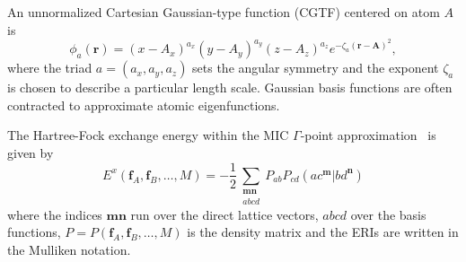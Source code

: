 \documentclass[prl,twocolumn,showpacs,twocolumngrid,superbib]{revtex4}
\def\Tr{{\rm Tr}}
\begin{document}
An unnormalized Cartesian Gaussian-type function (CGTF) centered on atom $A$ is
\begin{equation}
  \phi_a(\mathbf{r})=(x-A_x)^{a_x}(y-A_y)^{a_y}(z-A_z)^{a_z}e^{-\zeta_a(\mathbf{r-A})^2},
\end{equation}
where the triad $a=(a_x,a_y,a_z)$ sets the angular symmetry and the exponent $\zeta_a$
is chosen to describe a particular length scale. Gaussian basis functions are often
contracted to approximate atomic eigenfunctions.


The Hartree-Fock exchange energy within the MIC $\Gamma$-point approximation~\cite{CTymczak04b} 
is given by
\begin{equation}
E^x(\mathbf{f}_A,\mathbf{f}_B,\ldots,M)=
 -\frac{1}{2}\sum_{\substack{\mathbf{m}\mathbf{n}\\a b c d}}P_{ab}P_{cd}
 (ac^\mathbf{m}|bd^\mathbf{n})
\end{equation}
where the indices $\mathbf{mn}$ run over the direct lattice vectors, 
$abcd$ over the basis functions, 
$P=P(\mathbf{f}_A,\mathbf{f}_B,\ldots,M)$
is the density matrix 
and the ERIs are written in the Mulliken notation.
\end{document}
